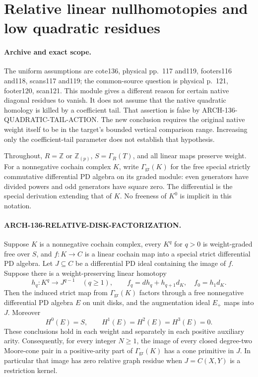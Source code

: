 \section{Relative linear nullhomotopies and low quadratic residues}
\label{sec:136-relative-disk-factorization}

\paragraph{Archive and exact scope.}
The uniform assumptions are cote136, physical pp.~117 and119,
footers116 and118, scans117 and119; the common-source question
is physical p.~121, footer120, scan121.  This module gives a
different reason for certain native diagonal residues to vanish.
It does not assume that the native quadratic homology is killed
by a coefficient tail.  That assertion is false by
ARCH-136-QUADRATIC-TAIL-ACTION.
The new conclusion requires the original native weight itself
to be in the target's bounded vertical comparison range.
Increasing only the coefficient-tail parameter does not establish
that hypothesis.

Throughout, \(R=\mathbb Z\) or \(\mathbb Z_{(p)}\),
\(S=\Gamma_R(T)\), and all linear maps preserve weight.
For a nonnegative cochain complex \(K\), write
\(\Gamma_{\mathrm{gr}}(K)\) for the free special strictly
commutative differential PD algebra on its graded module:
even generators have divided powers and odd generators have
square zero.  The differential is the special derivation
extending that of \(K\).  No freeness of \(K^0\) is
implicit in this notation.

\paragraph{ARCH-136-RELATIVE-DISK-FACTORIZATION.}
Suppose \(K\) is a nonnegative cochain complex, every
\(K^q\) for \(q>0\) is weight-graded free over \(S\),
and \(f:K\to C\) is a linear cochain map into a special
strict differential PD algebra.  Let \(J\subseteq C\)
be a differential PD ideal containing the image of \(f\).
Suppose there is a weight-preserving linear homotopy
\[
 h_q:K^q\longrightarrow J^{q-1}\quad(q\geq1),\qquad
 f_q=d h_q+h_{q+1}d_K,
 \quad f_0=h_1d_K.                                      \tag{136.RF1}
\]
Then the induced strict map from
\(\Gamma_{\mathrm{gr}}(K)\) factors through a free
nonnegative differential PD algebra \(E\) on unit disks,
and the augmentation ideal \(E_+\) maps into \(J\).
Moreover
\[
 H^0(E)=S,\qquad H^1(E)=H^2(E)=H^3(E)=0.                 \tag{136.RF2}
\]
These conclusions hold in each weight and separately in each
positive auxiliary arity.  Consequently, for every integer
\(N\geq1\), the image of every closed degree-two Moore-cone
pair in a positive-arity part of
\(\Gamma_{\mathrm{gr}}(K)\) has a cone primitive in
\(J\).  In particular that image has zero relative graph residue
when \(J=C(X,Y)\) is a restriction kernel.

